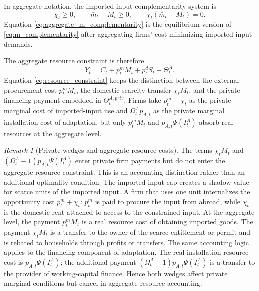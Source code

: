 ﻿\documentclass[12pt]{article}
\theoremstyle{remark}
\newtheorem{remark}{Remark}
\begin{document}
In aggregate notation, the imported-input complementarity system is
\begin{equation}
    \chi_t\ge 0,
    \qquad
    \bar m_t-M_t\ge 0,
    \qquad
    \chi_t(\bar m_t-M_t)=0.
    \label{eq:aggregate_m_complementarity}
\end{equation}
Equation \eqref{eq:aggregate_m_complementarity} is the equilibrium version of
\eqref{eq:m_complementarity} after aggregating firms' cost-minimizing imported-input demands.

The aggregate resource constraint is therefore
\begin{equation}
    Y_t
    =
    C_t
    +
    p_t^m M_t
    +
    p_t^d S_t
    +
    \Theta_t^A.
    \label{eq:resource_constraint}
\end{equation}
Equation \eqref{eq:resource_constraint} keeps the distinction between the external procurement
cost $p_t^mM_t$, the domestic scarcity transfer $\chi_tM_t$, and the private financing payment
embedded in $\Theta_t^{A,priv}$. Firms take $p_t^m+\chi_t$ as the private marginal cost of
imported-input use and $\Omega_t^Ap_{A,t}$ as the private marginal installation cost of adaptation,
but only $p_t^mM_t$ and $p_{A,t}\Psi(I_t^A)$ absorb real resources at the aggregate level.

\begin{remark}[Private wedges and aggregate resource costs]\label{rem:private_wedges_transfer}
The terms $\chi_tM_t$ and $(\Omega_t^A-1)p_{A,t}\Psi(I_t^A)$ enter private firm payments but do not
enter the aggregate resource constraint. This is an accounting distinction rather than an
additional optimality condition.
The imported-input cap creates a shadow value for scarce units of the imported input. A firm that
uses one unit internalizes the opportunity cost $p_t^m+\chi_t$: $p_t^m$ is paid to procure the
input from abroad, while $\chi_t$ is the domestic rent attached to access to the constrained input.
At the aggregate level, the payment $p_t^mM_t$ is a real resource cost of obtaining imported goods.
The payment $\chi_tM_t$ is a transfer to the owner of the scarce entitlement or permit and is
rebated to households through profits or transfers. The same accounting logic applies to the
financing component of adaptation. The real installation resource cost is
$p_{A,t}\Psi(I_t^A)$; the additional payment
$(\Omega_t^A-1)p_{A,t}\Psi(I_t^A)$ is a transfer to the provider of working-capital finance. Hence
both wedges affect private marginal conditions but cancel in aggregate resource accounting.
\end{remark}
\end{document}

